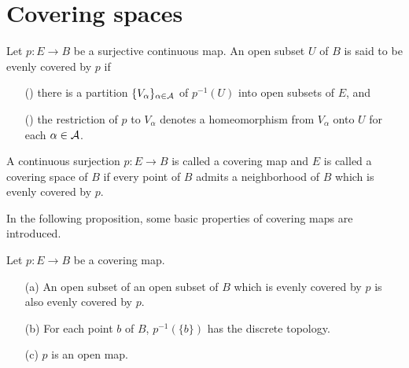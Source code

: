 \section{Covering spaces}

\begin{defi}
    Let $p: E\rightarrow B$ be a surjective continuous map.
    An open subset $U$ of $B$ is said to be evenly covered by $p$ if
    \begin{enumerate}
        \item[(\romannumeral 1)]
        {
            there is a partition $\{V_\alpha\}_{\alpha\in{\mathcal{A}}}$ of $p^{-1}(U)$ into open subsets of $E$, and
        }
        \item[(\romannumeral 2)]
        {
            the restriction of $p$ to $V_\alpha$ denotes a homeomorphism from $V_\alpha$ onto $U$ for each $\alpha\in{\mathcal{A}}$.
        }
    \end{enumerate}
    A continuous surjection $p: E\rightarrow B$ is called a covering map and $E$ is called a covering space of $B$ if every point of $B$ admits a neighborhood of $B$ which is evenly covered by $p$.
\end{defi}

In the following proposition, some basic properties of covering maps are introduced.
\begin{prop}
    Let $p: E\rightarrow B$ be a covering map.
    \begin{enumerate}
        \item[(a)]
        {
            An open subset of an open subset of $B$ which is evenly covered by $p$ is also evenly covered by $p$.
        }
        \item[(b)]
        {
            For each point $b$ of $B$, $p^{-1}(\{b\})$ has the discrete topology.
        }
        \item[(c)]
        {
            $p$ is an open map.
        }
    \end{enumerate}
\end{prop}

